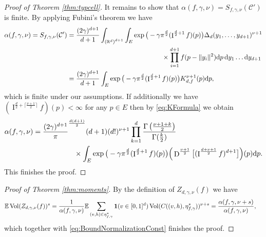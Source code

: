 \documentclass[11pt,a4paper]{article}
\theoremstyle{plain}
\theoremstyle{definition}
\theoremstyle{remark}
\def\EE{\mathbb{E}}
\def\RR{\mathbb{R}}
\def\cC{\mathcal{C}}
\newcommand{\dd}{{\rm d}}
\newcommand{\frI}{\mathop{\mathrm{I}}\nolimits}
\newcommand{\frD}{\mathop{\mathrm{D}}\nolimits}
\newcommand{\Vol}{\operatorname{Vol}}
\begin{document}
\begin{proof}[Proof of Theorem \ref{thm:typcell}]
     It remains to show that $\alpha(f,\gamma,\nu)=S_{f,\gamma,\nu}(\cC')$ is finite. By applying Fubini's theorem we have
    \begin{align*}
        \alpha(f,\gamma,\nu)=S_{f,\gamma,\nu}(\cC')&=\frac{(2\gamma)^{d+1}}{d+1}\int_{{(\RR^{d})}^{d+1}} \int_{E} \exp\big(-\gamma\pi^{\frac{d}{2}}(\frI^{\frac{d}{2}+1}f)(p)\big)\Delta_{d}(y_1,\dots,y_{d+1})^{\nu+1}\\
        &\hspace{5cm}\times\prod_{i=1}^{d+1}f(p-\|y_i\|^2)\dd p\,\dd y_1\dots\dd y_{d+1}\\
        &=\frac{(2\gamma)^{d+1}}{d+1}\int_{E} \exp\big(-\gamma\pi^{\frac{d}{2}}(\frI^{\frac{d}{2}+1}f)(p)\big)K_{d,f}^{\nu+1}(p)\dd p,
    \end{align*}
    which is finite under our assumptions. If additionally we have $(\frI^{\frac{d}{2}+\lceil\frac{\nu+1}{2}\rceil}f)(p)<\infty$ for any $p\in E$ then by \eqref{eq:KFormula} we obtain
    \begin{align*}
        \alpha(f,\gamma,\nu)&=\frac{(2\gamma)^{d+1}}\pi^{d(d+1)\over 2}{(d+1)(d!)^{\nu+1}} \prod_{k=1}^{d}\frac{\Gamma\left(\frac{\nu+1+k}{2}\right)}{\Gamma(\frac{k}{2})}\\
        &\hspace{2cm}\times\int_{E}\exp\big(-\gamma\pi^{\frac{d}{2}}(\frI^{\frac{d}{2}+1}f)(p)\big) \Big(\frD^{\frac{\nu+1}{2}}\big[(\frI^{\frac{d+\nu+1}{2}}f)^{d+1}\big]\Big)(p) \dd p.
    \end{align*}
    This finishes the proof.
\end{proof}

\begin{proof}[Proof of Theorem \ref{thm:moments}]
By the definition of $Z_{d,\gamma,\nu}(f)$ we have
    \begin{align*}
        \EE \Vol(Z_{d,\gamma,\nu}(f))^s &= \frac{1}{\alpha(f,\gamma,\nu)} \EE \sum_{(v,h)\in \eta^*_{f,\gamma}}{{\bf 1}}(v\in[0,1]^d)\Vol(C((v,h),\eta^*_{f,\gamma}))^{\nu+s}= \frac{\alpha(f,\gamma,\nu+s)}{\alpha(f,\gamma,\nu)},
    \end{align*}
    which together with \eqref{eq:BoundNormalizationConst} finishes the proof.
\end{proof}
\end{document}
